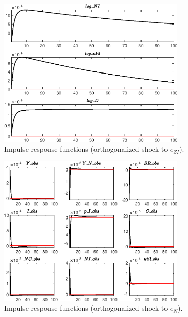 \begin{figure}[H]
\centering 
\includegraphics[width=0.80\textwidth]{BRS_growth/graphs/BRS_growth_IRF_e_ZI3}
\caption{Impulse response functions (orthogonalized shock to ${e_{ZI}}$).}\label{Fig:IRF:e_ZI:3}
\end{figure}
 
\begin{figure}[H]
\centering 
\includegraphics[width=0.80\textwidth]{BRS_growth/graphs/BRS_growth_IRF_e_N1}
\caption{Impulse response functions (orthogonalized shock to ${e_N}$).}\label{Fig:IRF:e_N:1}
\end{figure}
 
